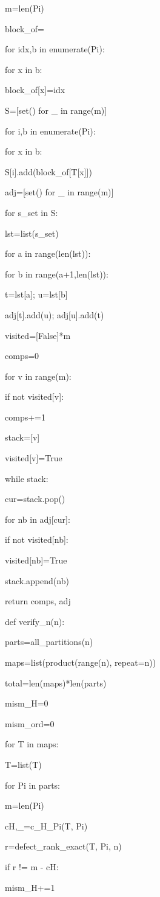 m=len(Pi)

block_of={}

for idx,b in enumerate(Pi):

for x in b:

block_of[x]=idx

S=[set() for _ in range(m)]

for i,b in enumerate(Pi):

for x in b:

S[i].add(block_of[T[x]])

adj=[set() for _ in range(m)]

for s_set in S:

lst=list(s_set)

for a in range(len(lst)):

for b in range(a+1,len(lst)):

t=lst[a]; u=lst[b]

adj[t].add(u); adj[u].add(t)

visited=[False]*m

comps=0

for v in range(m):

if not visited[v]:

comps+=1

stack=[v]

visited[v]=True

while stack:

cur=stack.pop()

for nb in adj[cur]:

if not visited[nb]:

visited[nb]=True

stack.append(nb)

return comps, adj


def verify_n(n):

parts=all_partitions(n)

maps=list(product(range(n), repeat=n))

total=len(maps)*len(parts)

mism_H=0

mism_ord=0

for T in maps:

T=list(T)

for Pi in parts:

m=len(Pi)

cH,_=c_H_Pi(T, Pi)

r=defect_rank_exact(T, Pi, n)

if r != m - cH:

mism_H+=1


